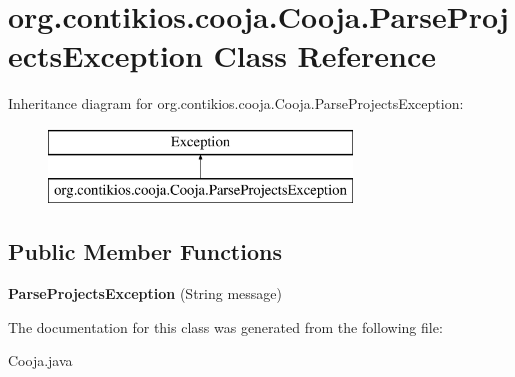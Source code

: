 \hypertarget{classorg_1_1contikios_1_1cooja_1_1Cooja_1_1ParseProjectsException}{\section{org.\-contikios.\-cooja.\-Cooja.\-Parse\-Projects\-Exception Class Reference}
\label{classorg_1_1contikios_1_1cooja_1_1Cooja_1_1ParseProjectsException}
}
Inheritance diagram for org.\-contikios.\-cooja.\-Cooja.\-Parse\-Projects\-Exception\-:\begin{figure}[H]
\begin{center}
\leavevmode
\includegraphics[height=2.000000cm]{classorg_1_1contikios_1_1cooja_1_1Cooja_1_1ParseProjectsException}
\end{center}
\end{figure}
\subsection*{Public Member Functions}
\begin{DoxyCompactItemize}
\item 
\hypertarget{classorg_1_1contikios_1_1cooja_1_1Cooja_1_1ParseProjectsException_a4647f58d68a98b1603e6648eb0510bdb}{{\bfseries Parse\-Projects\-Exception} (String message)}\label{classorg_1_1contikios_1_1cooja_1_1Cooja_1_1ParseProjectsException_a4647f58d68a98b1603e6648eb0510bdb}

\end{DoxyCompactItemize}


The documentation for this class was generated from the following file\-:\begin{DoxyCompactItemize}
\item 
Cooja.\-java\end{DoxyCompactItemize}
